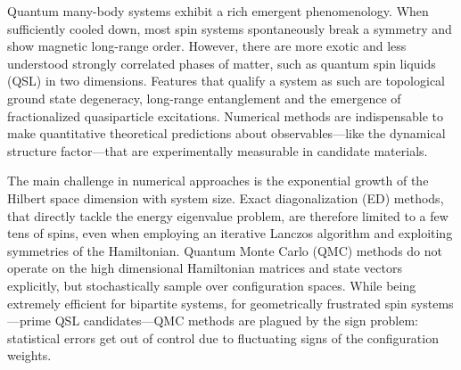 Quantum many-body systems exhibit a rich emergent phenomenology. When sufficiently cooled down, most spin systems spontaneously break a symmetry and show magnetic long-range order. However, there are more exotic and less understood strongly correlated phases of matter, such as quantum spin liquids (QSL) in two dimensions. Features that qualify a system as such are topological ground state degeneracy, long-range entanglement and the emergence of fractionalized quasiparticle excitations. Numerical methods are indispensable to make quantitative theoretical predictions about observables---like the dynamical structure factor---that are experimentally measurable in candidate materials. \cite{knolle2019field}

The main challenge in numerical approaches is the exponential growth of the Hilbert space dimension with system size. Exact diagonalization (ED) methods, that directly tackle the energy eigenvalue problem, are therefore limited to a few tens of spins, even when employing an iterative Lanczos algorithm and exploiting symmetries of the Hamiltonian. Quantum Monte Carlo (QMC) methods do not operate on the high dimensional Hamiltonian matrices and state vectors explicitly, but stochastically sample over configuration spaces. While being extremely efficient for bipartite systems, for geometrically frustrated spin systems---prime QSL candidates---QMC methods are plagued by the sign problem: statistical errors get out of control due to fluctuating signs of the configuration weights. \cite{sandvik2010computational}

